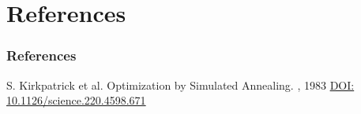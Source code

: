 \documentclass[aspectratio=43]{beamer}
\begin{document}
\section*{References}
\begin{frame}[allowframebreaks]
\frametitle{References}
	\begin{thebibliography}{10}
		

	  
	   
		  
		\beamertemplatearticlebibitems
	 
		S. Kirkpatrick et al.
		\newblock Optimization by Simulated Annealing.
		, 1983
		\newblock \href{hhttps://www.jstor.org/stable/1690046}{DOI: 10.1126/science.220.4598.671}

		




	



		


\end{thebibliography}
\end{frame}
\end{document}
